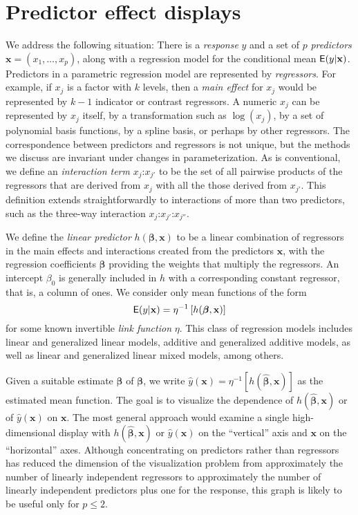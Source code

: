 \documentclass[article]{jss}
\newcommand{\x}{\mathbf{x}}
\newcommand{\bbetahat}{\widehat{\boldsymbol{\beta}}}
\newcommand{\bbeta}{\boldsymbol{\beta}}
\newcommand{\inter}[2]{\mbox{$#1$:$#2$}}
\newcommand{\yx}{\widehat{y}(\x)}
\begin{document}
\section{Predictor effect displays}\label{sec-background}\label{sec-effect-plots}

We address the following situation: There is a \emph{response} $y$ and
a set of $p$ \emph{predictors} $\x=(x_1, \ldots, x_p)$, along with a
regression model for the conditional mean $\E(y|\x)$. Predictors in a
parametric regression model are represented by \emph{regressors}.  For
example, if $x_j$ is a factor with $k$ levels, then a \emph{main
  effect} for $x_j$ would be represented by $k-1$ indicator or
contrast regressors.  A numeric $x_j$ can be represented by $x_j$
itself, by a transformation such as $\log(x_j)$, by a set of
polynomial basis functions, by a spline basis, or perhaps by other
regressors.  The correspondence between predictors and regressors is
not unique, but the methods we discuss are invariant under changes in
parameterization.  As is conventional, we define an \emph{interaction
  term} \inter{x_j}{x_{j'}} to be the set of all pairwise products of
the regressors that are derived from $x_j$ with all the those derived
from $x_{j'}$. This definition extends straightforwardly to
interactions of more than two predictors, such as the three-way
interaction $\inter{\inter{x_j}{x_{j'}}}{x_{j''}}$.

We define the \emph{linear predictor} $h(\bbeta, \x)$ to be a linear combination of regressors in the main effects and interactions created from the predictors $\x$, with the regression coefficients $\bbeta$ providing the weights that multiply the regressors. An intercept $\beta_0$ is generally included in $h$ with a corresponding constant regressor, that is, a column of ones.  We consider only mean functions of the form
\begin{equation}
\E(y|\x) = \eta^{-1}\left[h(\bbeta, \x)\right] \label{e1}
\end{equation}
for some known invertible \emph{link function} $\eta$.  This class of regression models includes linear and generalized linear models, additive and generalized additive models, as well as linear and generalized linear mixed models, among others.

Given a suitable estimate $\bbetahat$ of $\bbeta$, we write
$\yx{} = \eta^{-1}[h(\bbetahat,\x)]$ as the estimated mean
function. The goal is to visualize the dependence of
$h(\bbetahat, \x)$ or of $\yx$ on $\x$.  The most general approach
would examine a single high-dimensional display with
$h(\bbetahat, \x)$ or $\yx{}$ on the ``vertical'' axis and $\x$ on the
``horizontal'' axes.  Although concentrating on predictors rather than
regressors has reduced the dimension of the visualization problem from
approximately the number of linearly independent regressors to
approximately the number of linearly independent predictors plus one
for the response, this graph is likely to be useful only for
$p \le 2$.
\end{document}
